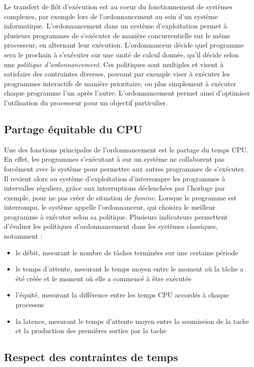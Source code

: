 		Le transfert de flôt d'exécution est au coeur du fonctionnement de systèmes complexes, par exemple lors de l'ordonnancement au sein d'un système informatique. L'ordonnancement dans un système d'exploitation permet à plusieurs programmes de s'exécuter de manière concurrentielle sur le même processeur, en alternant leur exécution. L'ordonnanceur décide quel programme sera le prochain à s'exécuter sur une unité de calcul donnée, qu'il décide selon une \emph{politique d'ordonnancement}. Ces politiques sont multiples et visent à satisfaire des contraintes diverses, pouvant par exemple viser à exécuter les programmes interactifs de manière prioritaire, ou plus simplement à exécuter chaque programme l'un après l'autre. L'ordonnancement permet ainsi d'optimiser l'utilisation du processeur pour un objectif particulier. 

			\subsection{Partage équitable du CPU}
		Une des fonctions principales de l'ordonnancement est le partage du temps CPU. En effet, les programmes s'exécutant à sur un système ne collaborent pas forcément avec le système pour permettre aux autres programmes de s'exécuter. Il revient alors au système d'exploitation d'interrompre les programmes à intervalles réguliers, grâce aux interruptions déclenchées par l'horloge par exemple, pour ne pas créer de situation de \emph{famine}. Lorsque le programme est interrompu, le système appelle l'ordonnanceur, qui choisira le meilleur programme à exécuter selon sa politique.
		Plusieurs indicateurs permettent d'évaluer les politiques d'ordonnancement dans les systèmes classiques, notamment :
		\begin{itemize}
			\item{le débit, mesurant le nombre de tâches terminées sur une certaine période}
			\item{le temps d'attente, mesurant le temps moyen entre le moment où la tâche a été créée et le moment où elle a commencé à être exécutée}
			\item{l'équité, mesurant la différence entre les temps CPU accordés à chaque processus}
			\item{la latence, mesurant le temps d'attente moyen entre la soumission de la tache et la production des premières sorties par la tache}
		\end{itemize}

			\subsection{Respect des contraintes de temps}


